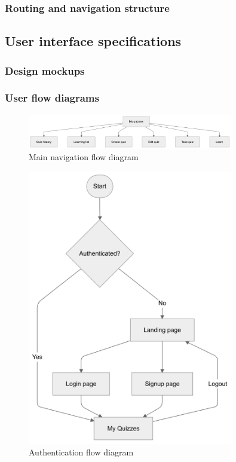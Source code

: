 \subsubsection{Routing and navigation structure}

\subsection{User interface specifications}

\subsubsection{Design mockups}

\subsubsection{User flow diagrams}

\begin{figure}[H]
    \centering
    \includegraphics[width=0.8\textwidth, keepaspectratio]{figures/flow-main.png}
    \caption{Main navigation flow diagram}
    \label{fig:flow-main}
\end{figure}

\begin{figure}[H]
    \centering
    \includegraphics[width=0.8\textwidth, keepaspectratio]{figures/flow-authentication.png}
    \caption{Authentication flow diagram}
    \label{fig:flow-authentication}
\end{figure}

